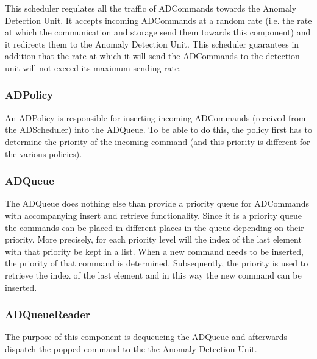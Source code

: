 \npar This scheduler regulates all the traffic of ADCommands towards the
Anomaly Detection Unit. It accepts incoming ADCommands at a random rate (i.e.
the rate at which the communication and storage send them towards this
component) and it redirects them to the Anomaly Detection Unit. This
scheduler guarantees in addition that the rate at which it will send the
ADCommands to the detection unit will not exceed its maximum sending rate.

\subsubsection{ADPolicy}

\npar An ADPolicy is responsible for inserting incoming ADCommands (received
from the ADScheduler) into the ADQueue. To be able to do this, the policy first
has to determine the priority of the incoming command (and this priority is
different for the various policies).

\subsubsection{ADQueue}

\npar The ADQueue does nothing else than provide a priority queue for
ADCommands with accompanying insert and retrieve functionality. Since
it is a priority queue the commands can be placed in different places in the
queue depending on their priority. More precisely, for each priority level will
the index of the last element with that priority be kept in a list. When a new
command needs to be inserted, the priority of that command is determined.
Subsequently, the priority is used to retrieve the index of the last element and
in this way the new command can be inserted.

\subsubsection{ADQueueReader}

\npar The purpose of this component is dequeueing the ADQueue and
afterwards dispatch the popped command to the the Anomaly Detection Unit.

